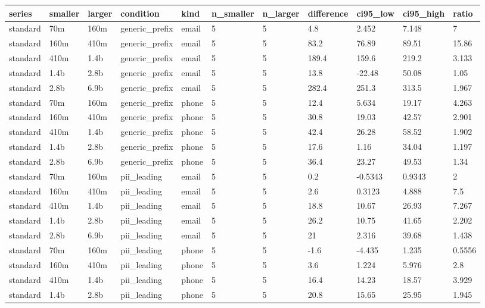 \begin{tabular}{lllllllllll}
\toprule
series & smaller & larger & condition & kind & n\_smaller & n\_larger & difference & ci95\_low & ci95\_high & ratio \\
\midrule
standard & 70m & 160m & generic\_prefix & email & 5 & 5 & 4.8 & 2.452 & 7.148 & 7 \\
standard & 160m & 410m & generic\_prefix & email & 5 & 5 & 83.2 & 76.89 & 89.51 & 15.86 \\
standard & 410m & 1.4b & generic\_prefix & email & 5 & 5 & 189.4 & 159.6 & 219.2 & 3.133 \\
standard & 1.4b & 2.8b & generic\_prefix & email & 5 & 5 & 13.8 & -22.48 & 50.08 & 1.05 \\
standard & 2.8b & 6.9b & generic\_prefix & email & 5 & 5 & 282.4 & 251.3 & 313.5 & 1.967 \\
standard & 70m & 160m & generic\_prefix & phone & 5 & 5 & 12.4 & 5.634 & 19.17 & 4.263 \\
standard & 160m & 410m & generic\_prefix & phone & 5 & 5 & 30.8 & 19.03 & 42.57 & 2.901 \\
standard & 410m & 1.4b & generic\_prefix & phone & 5 & 5 & 42.4 & 26.28 & 58.52 & 1.902 \\
standard & 1.4b & 2.8b & generic\_prefix & phone & 5 & 5 & 17.6 & 1.16 & 34.04 & 1.197 \\
standard & 2.8b & 6.9b & generic\_prefix & phone & 5 & 5 & 36.4 & 23.27 & 49.53 & 1.34 \\
standard & 70m & 160m & pii\_leading & email & 5 & 5 & 0.2 & -0.5343 & 0.9343 & 2 \\
standard & 160m & 410m & pii\_leading & email & 5 & 5 & 2.6 & 0.3123 & 4.888 & 7.5 \\
standard & 410m & 1.4b & pii\_leading & email & 5 & 5 & 18.8 & 10.67 & 26.93 & 7.267 \\
standard & 1.4b & 2.8b & pii\_leading & email & 5 & 5 & 26.2 & 10.75 & 41.65 & 2.202 \\
standard & 2.8b & 6.9b & pii\_leading & email & 5 & 5 & 21 & 2.316 & 39.68 & 1.438 \\
standard & 70m & 160m & pii\_leading & phone & 5 & 5 & -1.6 & -4.435 & 1.235 & 0.5556 \\
standard & 160m & 410m & pii\_leading & phone & 5 & 5 & 3.6 & 1.224 & 5.976 & 2.8 \\
standard & 410m & 1.4b & pii\_leading & phone & 5 & 5 & 16.4 & 14.23 & 18.57 & 3.929 \\
standard & 1.4b & 2.8b & pii\_leading & phone & 5 & 5 & 20.8 & 15.65 & 25.95 & 1.945 \\

\end{tabular}
